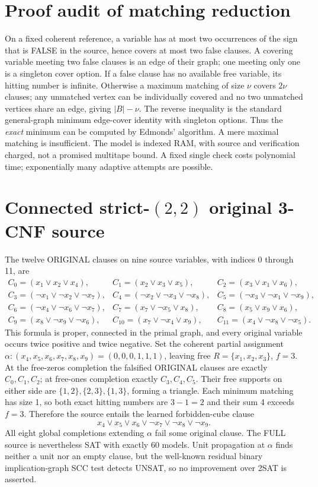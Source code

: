 \documentclass{article}
\begin{document}
\section*{Proof audit of matching reduction}
On a fixed coherent reference, a variable has at most two occurrences of the sign that is FALSE in the source, hence covers at most two false clauses. A covering variable meeting two false clauses is an edge of their graph; one meeting only one is a singleton cover option. If a false clause has no available free variable, its hitting number is infinite. Otherwise a maximum matching of size $\nu$ covers $2\nu$ clauses; any unmatched vertex can be individually covered and no two unmatched vertices share an edge, giving $|B|-\nu$. The reverse inequality is the standard general-graph minimum edge-cover identity with singleton options. Thus the \emph{exact} minimum can be computed by Edmonds' algorithm. A mere maximal matching is insufficient. The model is indexed RAM, with source and verification charged, not a promised multitape bound. A fixed single check costs polynomial time; exponentially many adaptive attempts are possible.


\section*{Connected strict-$(2,2)$ original 3-CNF source}
The twelve ORIGINAL clauses on nine source variables, with indices 0 through 11, are
\[
\begin{array}{lll}
C_0=(x_1\vee x_2\vee x_4),&
C_1=(x_2\vee x_3\vee x_5),&
C_2=(x_3\vee x_1\vee x_6),\\
C_3=(\neg x_1\vee\neg x_2\vee\neg x_7),&
C_4=(\neg x_2\vee\neg x_3\vee\neg x_8),&
C_5=(\neg x_3\vee\neg x_1\vee\neg x_9),\\
C_6=(\neg x_4\vee\neg x_6\vee\neg x_7),&
C_7=(x_7\vee\neg x_5\vee x_8),&
C_8=(x_5\vee x_9\vee x_6),\\
C_9=(x_8\vee\neg x_9\vee\neg x_6),&
C_{10}=(x_7\vee\neg x_4\vee x_9),&
C_{11}=(x_4\vee\neg x_8\vee\neg x_5).
\end{array}
\]
This formula is proper, connected in the primal graph, and every original variable occurs twice positive and twice negative. Set the coherent partial assignment $\alpha:(x_4,x_5,x_6,x_7,x_8,x_9)=(0,0,0,1,1,1)$, leaving free $R=\{x_1,x_2,x_3\}$, $f=3$. At the free-zeros completion the falsified ORIGINAL clauses are exactly $C_0,C_1,C_2$; at free-ones completion exactly $C_3,C_4,C_5$. Their free supports on either side are $\{1,2\},\{2,3\},\{1,3\}$, forming a triangle. Each minimum matching has size 1, so both exact hitting numbers are $3-1=2$ and their sum 4 exceeds $f=3$. Therefore the source entails the learned forbidden-cube clause
\[
x_4\vee x_5\vee x_6\vee\neg x_7\vee\neg x_8\vee\neg x_9.
\]
All eight global completions extending $\alpha$ fail some original clause. The FULL source is nevertheless SAT with exactly 60 models. Unit propagation at $\alpha$ finds neither a unit nor an empty clause, but the well-known residual binary implication-graph SCC test detects UNSAT, so no improvement over 2SAT is asserted.
\end{document}
